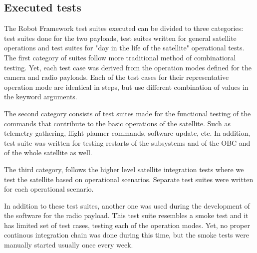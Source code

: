 \documentclass[english,12pt,a4paper,pdftex,elec,utf8]{aaltothesis}
\begin{document}
\subsection{Executed tests}
The Robot Framework test suites executed can be divided to three categories: test suites done for the two payloads, test suites written for general satellite operations and test suites for "day in the life of the satellite" operational tests. The first category of suites follow more traditional method of combinatioral testing. Yet, each test case was derived from the operation modes defined for the camera and radio payloads. Each of the test cases for their representative operation mode are identical in steps, but use different combination of values in the keyword arguments.\par
The second category consists of test suites made for the functional testing of the commands that contribute to the basic operations of the satellite. Such as telemetry gathering, flight planner commands, software update, etc. In addition, test suite was written for testing restarts of the subsystems and of the OBC and of the whole satellite as well.\par 
The third category, follows the higher level satellite integration tests where we test the satellite based on operational scenarios. Separate test suites were written for each operational scenario.\par
In addition to these test suites, another one was used during the development of the software for the radio payload. This test suite resembles a smoke test and it has limited set of test cases, testing each of the operation modes. Yet, no proper continous integration chain was done during this time, but the smoke tests were manually started usually once every week.\par   
\end{document}
